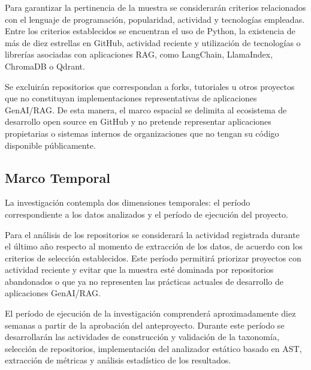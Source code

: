 Para garantizar la pertinencia de la muestra se considerarán criterios relacionados con el lenguaje de programación, popularidad, actividad y tecnologías empleadas. Entre los criterios establecidos se encuentran el uso de Python, la existencia de más de diez estrellas en GitHub, actividad reciente y utilización de tecnologías o librerías asociadas con aplicaciones RAG, como LangChain, LlamaIndex, ChromaDB o Qdrant.

Se excluirán repositorios que correspondan a forks, tutoriales u otros proyectos que no constituyan implementaciones representativas de aplicaciones GenAI/RAG. De esta manera, el marco espacial se delimita al ecosistema de desarrollo open source en GitHub y no pretende representar aplicaciones propietarias o sistemas internos de organizaciones que no tengan su código disponible públicamente.
 
\subsection{Marco Temporal}
 
La investigación contempla dos dimensiones temporales: el período correspondiente a los datos analizados y el período de ejecución del proyecto.

Para el análisis de los repositorios se considerará la actividad registrada durante el último año respecto al momento de extracción de los datos, de acuerdo con los criterios de selección establecidos. Este período permitirá priorizar proyectos con actividad reciente y evitar que la muestra esté dominada por repositorios abandonados o que ya no representen las prácticas actuales de desarrollo de aplicaciones GenAI/RAG.

El período de ejecución de la investigación comprenderá aproximadamente diez semanas a partir de la aprobación del anteproyecto. Durante este período se desarrollarán las actividades de construcción y validación de la taxonomía, selección de repositorios, implementación del analizador estático basado en AST, extracción de métricas y análisis estadístico de los resultados.